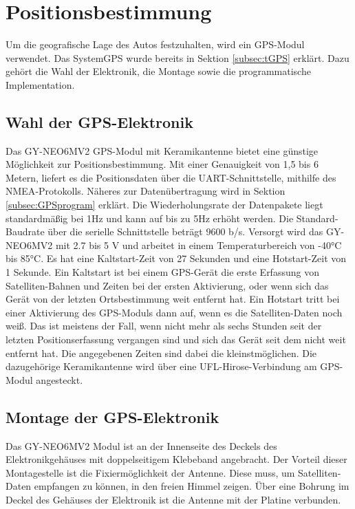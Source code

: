 \section{Positionsbestimmung}
\label{sec:GPS}
Um die geografische Lage des Autos festzuhalten, wird ein \ac{GPS}-Modul verwendet. Das System\ac{GPS} wurde bereits in Sektion \ref{subsec:tGPS} erklärt. Dazu gehört die Wahl der Elektronik, die Montage sowie die programmatische Implementation.

\subsection{Wahl der GPS-Elektronik}
\label{subsec:GPSchoice}
Das GY-NEO6MV2 \ac{GPS}-Modul mit Keramikantenne bietet eine günstige Möglichkeit zur Positionsbestimmung. Mit einer Genauigkeit von 1,5 bis 6 Metern, liefert es die Positionsdaten über die \ac{UART}-Schnittstelle, mithilfe des \ac{NMEA}-Protokolls. Näheres zur Datenübertragung wird in Sektion \ref{subsec:GPSprogram} erklärt. Die Wiederholungsrate der Datenpakete liegt standardmäßig bei 1Hz und kann auf bis zu 5Hz erhöht werden. Die Standard-Baudrate über die serielle Schnittstelle beträgt 9600 b/s. Versorgt wird das GY-NEO6MV2 mit 2.7 bis 5 V und arbeitet in einem Temperaturbereich von -40°C bis 85°C. Es hat eine Kaltstart-Zeit von 27 Sekunden und eine Hotstart-Zeit von 1 Sekunde. Ein Kaltstart ist bei einem GPS-Gerät die erste Erfassung von Satelliten-Bahnen und Zeiten bei der ersten Aktivierung, oder wenn sich das Gerät von der letzten Ortsbestimmung weit entfernt hat. Ein Hotstart tritt bei einer Aktivierung des GPS-Moduls dann auf, wenn es die Satelliten-Daten noch weiß. Das ist meistens der Fall, wenn nicht mehr als sechs Stunden seit der letzten Positionserfassung vergangen sind und sich das Gerät seit dem nicht weit entfernt hat. Die angegebenen Zeiten sind dabei die kleinstmöglichen. Die dazugehörige Keramikantenne wird über eine UFL-Hirose-Verbindung am GPS-Modul angesteckt. 

\subsection{Montage der GPS-Elektronik}
\label{subsec:GPSmount}
Das GY-NEO6MV2 Modul ist an der Innenseite des Deckels des Elektronikgehäuses mit doppelseitigem Klebeband angebracht. Der Vorteil dieser Montagestelle ist die Fixiermöglichkeit der Antenne. Diese muss, um Satelliten-Daten empfangen zu können, in den freien Himmel zeigen. Über eine Bohrung im Deckel des Gehäuses der Elektronik ist die Antenne mit der Platine verbunden.

